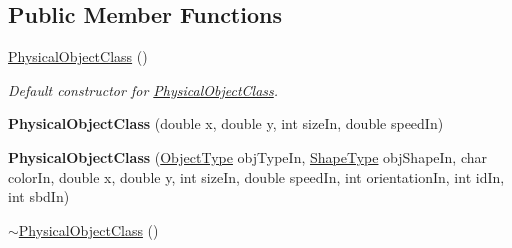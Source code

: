 \subsection*{Public Member Functions}
\begin{DoxyCompactItemize}
\item 
\hyperlink{classPhysicalObjectClass_a960979388739197bbf20ac18d08d7021}{Physical\-Object\-Class} ()
\begin{DoxyCompactList}\small\item\em Default constructor for \hyperlink{classPhysicalObjectClass}{Physical\-Object\-Class}. \end{DoxyCompactList}\item 
\hypertarget{classPhysicalObjectClass_a7cdfb22cf10eab196c05058891d15911}{{\bfseries Physical\-Object\-Class} (double x, double y, int size\-In, double speed\-In)}\label{classPhysicalObjectClass_a7cdfb22cf10eab196c05058891d15911}

\item 
\hypertarget{classPhysicalObjectClass_a65c7fba02b87fbf45ff775cc3225dba6}{{\bfseries Physical\-Object\-Class} (\hyperlink{PhysicalObjectClass_8h_a842c5e2e69277690b064bf363c017980}{Object\-Type} obj\-Type\-In, \hyperlink{PhysicalObjectClass_8h_a5a4538eeab397888d88a4eefcc5a1345}{Shape\-Type} obj\-Shape\-In, char color\-In, double x, double y, int size\-In, double speed\-In, int orientation\-In, int id\-In, int sbd\-In)}\label{classPhysicalObjectClass_a65c7fba02b87fbf45ff775cc3225dba6}

\item 
\hypertarget{classPhysicalObjectClass_a97db381b4e2e357eeb8aeeb580d0b7bd}{\hyperlink{classPhysicalObjectClass_a97db381b4e2e357eeb8aeeb580d0b7bd}{$\sim$\-Physical\-Object\-Class} ()}\label{classPhysicalObjectClass_a97db381b4e2e357eeb8aeeb580d0b7bd}


\end{DoxyCompactItemize}
